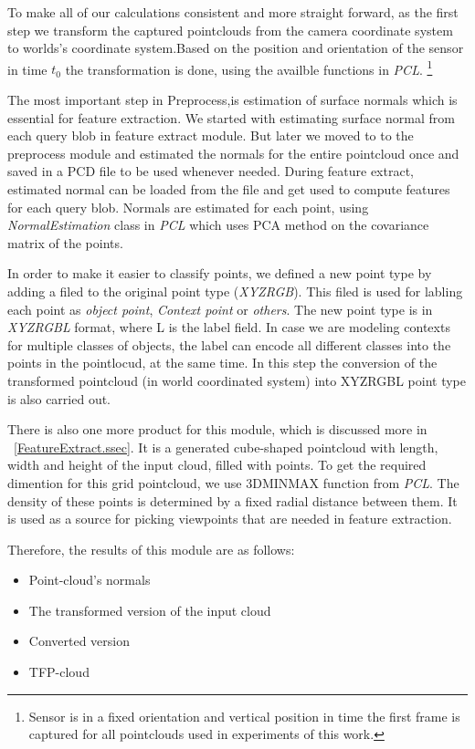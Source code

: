 
 To make all of our calculations consistent and more straight forward, as the first step we transform the captured pointclouds from the camera coordinate system to worlds's coordinate system.Based on the position and orientation of the sensor in time $t_0$ the transformation is done, using the availble functions in {\it PCL}.  
 \footnote{Sensor is in a fixed orientation and vertical position in time the first frame is captured for all pointclouds 
 used in experiments of this work.}
 
 
 The most important step in Preprocess,is estimation of surface normals which is essential for feature extraction. %
 We started with estimating surface normal from each query blob in feature extract module. But later we moved to to the preprocess module and estimated the normals for the entire pointcloud once and saved in a PCD file to be used whenever needed. During feature extract, estimated normal can be loaded from the file and get used to compute features for each query blob. Normals are estimated for each point, using {\it NormalEstimation} class in {\it PCL} which uses PCA method on the covariance matrix of the points.
 
 
 In order to make it easier to classify points, we defined a new point type by adding a filed to the original point type ({\it XYZRGB}). This filed is used for labling each point as {\it object point}, {\it Context point} or {\it others}. The new point type is in {\it XYZRGBL} format, where L is the label field. In case we are modeling contexts for multiple classes of objects, the label can encode all different classes into the points in the pointlocud, at the same time. In this step the conversion of the transformed pointcloud (in world coordinated system) into XYZRGBL point type is also carried out.
 
 
 There is also one more product for this module, which is discussed more in ~\ref{FeatureExtract.ssec}.
 It is a generated cube-shaped pointcloud with length, width and height of the input cloud, filled with points. To get the required dimention for this grid pointcloud, we use 3DMINMAX function from {\it PCL}. The density of these points is determined by a fixed radial distance between them. It is used as a source for picking viewpoints that are needed in feature extraction.
 
 Therefore, the results of this module are as follows:
 \begin{itemize}
  \item Point-cloud's normals
  \item The transformed version of the input cloud
  \item Converted version
  \item TFP-cloud
 \end{itemize}
 

